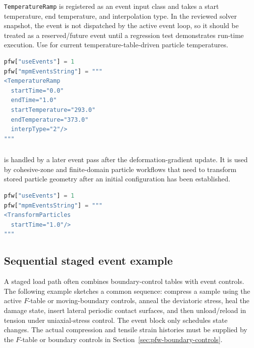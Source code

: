 \texttt{TemperatureRamp} is registered as an event input class and takes a start temperature, end temperature, and interpolation type.  In the reviewed solver snapshot, the event is not dispatched by the active event loop, so it should be treated as a reserved/future event until a regression test demonstrates run-time execution.  Use  for current temperature-table-driven particle temperatures.

\begin{lstlisting}[language=Python,caption={Registered but currently not dispatched temperature-ramp event.}]
pfw["useEvents"] = 1
pfw["mpmEventsString"] = """
<TemperatureRamp
  startTime="0.0"
  endTime="1.0"
  startTemperature="293.0"
  endTemperature="373.0"
  interpType="2"/>
"""
\end{lstlisting}

\subsubsection{}

 is handled by a later event pass after the deformation-gradient update.  It is used by cohesive-zone and finite-domain particle workflows that need to transform stored particle geometry after an initial configuration has been established.

\begin{lstlisting}[language=Python,caption={Transform-particles event.}]
pfw["useEvents"] = 1
pfw["mpmEventsString"] = """
<TransformParticles
  startTime="1.0"/>
"""
\end{lstlisting}

\subsection{Sequential staged event example}
\label{sec:pfw-sequential-events-example}

A staged load path often combines boundary-control tables with event controls.  The following example sketches a common sequence: compress a sample using the active \(F\)-table or moving-boundary controls, anneal the deviatoric stress, heal the damage state, insert lateral periodic contact surfaces, and then unload/reload in tension under uniaxial-stress control.  The event block only schedules state changes.  The actual compression and tensile strain histories must be supplied by the \(F\)-table or boundary controls in Section~\ref{sec:pfw-boundary-controls}.

